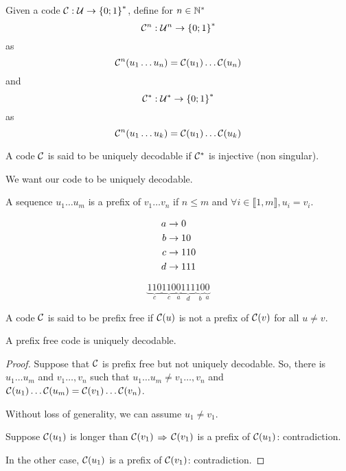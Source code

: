 \begin{definition}
    Given a code $\mathcal{C} : \mathcal{U} \rightarrow \left\{ 0;1 \right\}^*$, define for $n\in\mathbb{N}^*$
    \[
        \mathcal{C}^n : \mathcal{U}^n \rightarrow \left\{ 0;1 \right\}^*
    \]
    as
    \[
        \mathcal{C}^n(u_1\ldots u_n) = \mathcal{C}(u_1) \ldots \mathcal{C}(u_n)
    \]
    and
    \[
        \mathcal{C}^* : \mathcal{U}^* \rightarrow \left\{ 0;1 \right\}^*
    \]
    as
    \[
        \mathcal{C}^n(u_1\ldots u_k) = \mathcal{C}(u_1) \ldots \mathcal{C}(u_k)
    \]
\end{definition}

\begin{definition}
    A code $\mathcal{C}$ is said to be uniquely decodable if $\mathcal{C}^*$ is injective (non singular).
\end{definition}

We want our code to be uniquely decodable.

\begin{definition}
    A sequence $u_1\ldots u_m$ is a prefix of $v_1 \ldots v_n$ if $n\leqslant m$ and $\forall i\in\llbracket 1,m\rrbracket, u_i = v_i$.
\end{definition}

\begin{example}
    \[
        \begin{aligned}
            a &\rightarrow 0\\
            b &\rightarrow 10\\
            c &\rightarrow 110\\
            d &\rightarrow 111
        \end{aligned}       
    \]
    
    \[
        \underbrace{110}_{c}\underbrace{110}_{c}\underbrace{0}_{a}\underbrace{111}_{d}\underbrace{10}_{b} \underbrace{0}_{a}
    \]
\end{example}

\begin{definition}
    A code $\mathcal{C}$ is said to be prefix free if $\mathcal{C}(u)$ is not a prefix of $\mathcal{C}(v)$ for all $u\neq v$.
\end{definition}

\begin{theorem}
    A prefix free code is uniquely decodable.
\end{theorem}
\begin{proof}
    Suppose that $\mathcal{C}$ is prefix free but not uniquely decodable. So, there is  $u_1\ldots u_m$ and $v_1\ldots, v_n$ such that $u_1\ldots u_m \neq v_1\ldots, v_n$ and $\mathcal{C}(u_1) \ldots \mathcal{C}(u_m) = \mathcal{C}(v_1) \ldots \mathcal{C}(v_n)$.

    Without loss of generality, we can assume $u_1 \neq v_1$.
    
    Suppose $\mathcal{C}(u_1)$ is longer than $\mathcal{C}(v_1)$ $\Rightarrow$ $\mathcal{C}(v_1)$ is a prefix of $\mathcal{C}(u_1)$: contradiction.
    
    In the other case, $\mathcal{C}(u_1)$ is a prefix of $\mathcal{C}(v_1)$: contradiction.
\end{proof}

